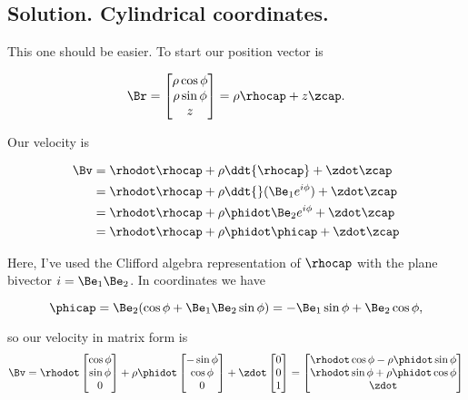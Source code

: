 \subsection{Solution.  Cylindrical coordinates.}

This one should be easier.  To start our position vector is

\begin{equation}\label{eqn:classicalMechanicsPs2:90}
\Br =
\begin{bmatrix}
\rho \cos\phi \\
\rho \sin\phi \\
z
\end{bmatrix}
= \rho \rhocap + z \zcap.
\end{equation}

Our velocity is

\begin{align*}
\Bv
&= \rhodot \rhocap + \rho \ddt{\rhocap} + \zdot \zcap \\
&= \rhodot \rhocap + \rho \ddt{}(\Be_1 e^{i\phi}) + \zdot \zcap \\
&= \rhodot \rhocap + \rho \phidot \Be_2 e^{i\phi} + \zdot \zcap \\
&= \rhodot \rhocap + \rho \phidot \phicap + \zdot \zcap \\
\end{align*}

Here, I've used the Clifford algebra representation of $\rhocap$ with the plane bivector $i = \Be_1 \Be_2$.  In coordinates we have

\begin{equation}\label{eqn:classicalMechanicsPs2:110}
\phicap = \Be_2 (\cos\phi + \Be_1 \Be_2 \sin\phi) = -\Be_1 \sin\phi + \Be_2 \cos\phi,
\end{equation}

so our velocity in matrix form is
\begin{equation}\label{eqn:classicalMechanicsPs2:130}
\Bv = \rhodot
\begin{bmatrix}
\cos\phi \\
\sin\phi \\
0
\end{bmatrix}
+
\rho \phidot
\begin{bmatrix}
-\sin\phi \\
\cos\phi \\
0
\end{bmatrix}
+
\zdot
\begin{bmatrix}
0 \\
0 \\
1
\end{bmatrix}
=
\begin{bmatrix}
\rhodot \cos\phi - \rho \phidot \sin\phi \\
\rhodot \sin\phi + \rho \phidot \cos\phi \\
\zdot
\end{bmatrix}
\end{equation}

